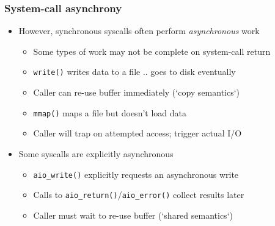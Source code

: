 \begin{frame}
  \frametitle{System-call asynchrony}

  \begin{itemize}
    \item However, synchronous syscalls often perform \textit{asynchronous} work
    \begin{itemize}
      \item Some types of work may not be complete on system-call return

      \pause
      \smallskip

      \item \texttt{write()} writes data to a file .. goes to disk eventually
      \item Caller can re-use buffer immediately (`copy semantics`)

      \pause
      \smallskip

      \item \texttt{mmap()} maps a file but doesn't load data
      \item Caller will trap on attempted access; trigger actual I/O
    \end{itemize}


    \pause
    \medskip

    \item Some syscalls are explicitly asynchronous
    \begin{itemize}
      \item \texttt{aio\_write()} explicitly requests an asynchronous write
      \item Calls to \texttt{aio\_return()}/\texttt{aio\_error()} collect
	results later
      \item Caller must wait to re-use buffer (`shared semantics`)
    \end{itemize}
  \end{itemize}
\end{frame}

